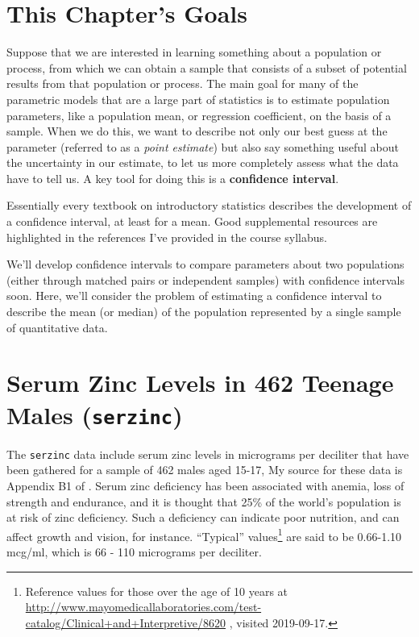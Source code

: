 \documentclass[
]{book}
\begin{document}
\hypertarget{this-chapters-goals}{%
\section{This Chapter's Goals}\label{this-chapters-goals}}

Suppose that we are interested in learning something about a population or process, from which we can obtain a sample that consists of a subset of potential results from that population or process. The main goal for many of the parametric models that are a large part of statistics is to estimate population parameters, like a population mean, or regression coefficient, on the basis of a sample. When we do this, we want to describe not only our best guess at the parameter (referred to as a \emph{point estimate}) but also say something useful about the uncertainty in our estimate, to let us more completely assess what the data have to tell us. A key tool for doing this is a \textbf{confidence interval}.

Essentially every textbook on introductory statistics describes the development of a confidence interval, at least for a mean. Good supplemental resources are highlighted in the references I've provided in the course syllabus.

We'll develop confidence intervals to compare parameters about two populations (either through matched pairs or independent samples) with confidence intervals soon. Here, we'll consider the problem of estimating a confidence interval to describe the mean (or median) of the population represented by a single sample of quantitative data.

\hypertarget{serum-zinc-levels-in-462-teenage-males-serzinc}{%
\section{\texorpdfstring{Serum Zinc Levels in 462 Teenage Males (\texttt{serzinc})}{Serum Zinc Levels in 462 Teenage Males (serzinc)}}\label{serum-zinc-levels-in-462-teenage-males-serzinc}}

The \texttt{serzinc} data include serum zinc levels in micrograms per deciliter that have been gathered for a sample of 462 males aged 15-17, My source for these data is Appendix B1 of \citet{PaganoGauvreau}. Serum zinc deficiency has been associated with anemia, loss of strength and endurance, and it is thought that 25\% of the world's population is at risk of zinc deficiency. Such a deficiency can indicate poor nutrition, and can affect growth and vision, for instance. ``Typical'' values\footnote{Reference values for those over the age of 10 years at \url{http://www.mayomedicallaboratories.com/test-catalog/Clinical+and+Interpretive/8620} , visited 2019-09-17.} are said to be 0.66-1.10 mcg/ml, which is 66 - 110 micrograms per deciliter.
\end{document}
